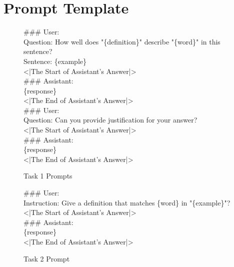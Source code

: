 \documentclass{brandeis-thesis3.2}
\theoremstyle{plain}
\theoremstyle{definition}
\theoremstyle{remark}
\numberwithin{equation}{section}
\begin{document}
\chapter{Prompt Template}
\begin{figure}[h!]
\centering
\begin{tcolorbox}[promptbox]

\#\#\# User:\\
Question: How well does "\{definition\}" describe "\{word\}" in this sentence?\\
Sentence: \{example\}\\

<|The Start of Assistant's Answer|>\\
\#\#\# Assistant:\\
\{response\}\\
<|The End of Assistant's Answer|>\\

\#\#\# User:\\
Question: Can you provide justification for your answer?\\

<|The Start of Assistant's Answer|>\\
\#\#\# Assistant:\\
\{response\}\\
<|The End of Assistant's Answer|>\\
\end{tcolorbox}
\label{fig:task_1}
\caption{Task 1 Prompts}
\end{figure}

\begin{figure}[h!]
\centering
\begin{tcolorbox}[promptbox]

\#\#\# User:\\
Instruction: Give a definition that matches \{word\} in "\{example\}"?\\

<|The Start of Assistant's Answer|>\\
\#\#\# Assistant:\\
\{response\}\\
<|The End of Assistant's Answer|>\\
\end{tcolorbox}
\label{fig:task_2}
\caption{Task 2 Prompt}
\end{figure}
\end{document}
